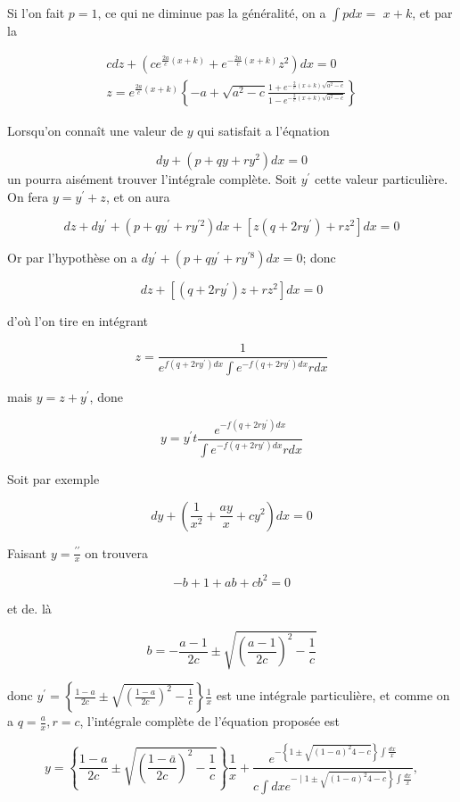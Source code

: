 \documentclass{article}
\begin{document}
Si l'on fait \(p=1\), ce qui ne diminue pas la généralité, on a \(\int p d x=\) \(x+k\), et par la

\[
\begin{gathered}
c d z+\left(c e^{\frac{2 a}{c}(x+k)}+e^{-\frac{2 a}{c}(x+k)} z^{2}\right) d x=0 \\
z=e^{\frac{2 a}{c}(x+k)}\left\{-a+\sqrt{a^{2}-c} \frac{1+e^{-\frac{2}{c}(x+k) \sqrt{a^{2}-c}}}{1-e^{-\frac{2}{c}(x+k) \sqrt{a^{2}-c}}}\right\}
\end{gathered}
\]

Lorsqu'on connaît une valeur de \(y\) qui satisfait a l'éqnation

\[
d y+\left(p+q y+r y^{2}\right) d x=0
\]
un pourra aisément trouver l'intégrale complète. Soit \(y^{\prime}\) cette valeur particulière. On fera \(y=y^{\prime}+z\), et on aura

\[
d z+d y^{\prime}+\left(p+q y^{\prime}+r y^{\prime 2}\right) d x+\left[z\left(q+2 r y^{\prime}\right)+r z^{2}\right] d x=0
\]

Or par l'hypothèse on a \(d y^{\prime}+\left(p+q y^{\prime}+r y^{\prime 8}\right) d x=0\); donc

\[
d z+\left[\left(q+2 r y^{\prime}\right) z+r z^{2}\right] d x=0
\]

d'où l'on tire en intégrant

\[
z=\frac{1}{e^{f\left(q+2 r y^{\prime}\right) d x} \int e^{-f\left(q+2 r y^{\prime}\right) d x} r d x}
\]

mais \(y=z+y^{\prime}\), done

\[
y=y^{\prime} t \frac{e^{-f\left(q+2 r y^{\prime}\right) d x}}{\int e^{-f\left(q+2 r y^{\prime}\right) d x} r d x}
\]

Soit par exemple

\[
d y+\left(\frac{1}{x^{2}}+\frac{a y}{x}+c y^{2}\right) d x=0
\]

Faisant \(y=\frac{\prime \prime}{x}\) on trouvera

\[
-b+1+a b+c b^{2}=0
\]

et de. là

\[
b=-\frac{a-1}{2 c} \pm \sqrt{\left(\frac{a-1}{2 c}\right)^{2}-\frac{1}{c}}
\]

donc \(y^{\prime}=\left\{\frac{1-a}{2 c} \pm \sqrt{\left(\frac{1-a}{2 c}\right)^{2}-\frac{1}{c}}\right\} \frac{1}{x}\) est une intégrale particulière, et comme on a \(q=\frac{a}{x}, r=c\), l'intégrale complète de l'équation proposée est

\[
y=\left\{\frac{1-a}{2 c} \pm \sqrt{\left(\frac{1-\bar{a}}{2 c}\right)^{2}-\frac{1}{c}}\right\} \frac{1}{x}+\frac{e^{-\left\{1 \pm \sqrt{(1-a)^{2} 4-c}\right\} \int \frac{d x}{x}}}{c \int d x e^{\left.-\mid 1 \pm \sqrt{(1-a)^{2} 4-c}\right\} \int \frac{d x}{x}}},
\]
\end{document}
